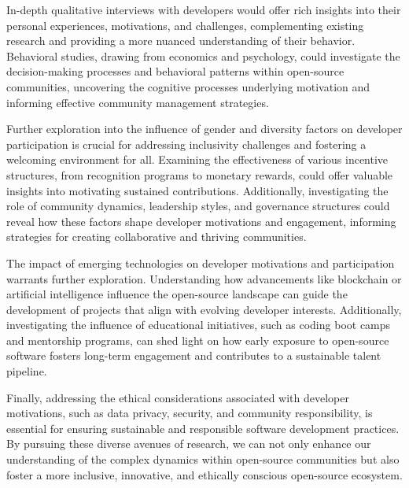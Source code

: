 In-depth qualitative interviews with developers would offer rich insights into their personal experiences, motivations, and challenges, complementing existing research and providing a more nuanced understanding of their behavior.  Behavioral studies, drawing from economics and psychology, could investigate the decision-making processes and behavioral patterns within open-source communities, uncovering the cognitive processes underlying motivation and informing effective community management strategies.

Further exploration into the influence of gender and diversity factors on developer participation is crucial for addressing inclusivity challenges and fostering a welcoming environment for all. Examining the effectiveness of various incentive structures, from recognition programs to monetary rewards, could offer valuable insights into motivating sustained contributions. Additionally, investigating the role of community dynamics, leadership styles, and governance structures could reveal how these factors shape developer motivations and engagement, informing strategies for creating collaborative and thriving communities.

The impact of emerging technologies on developer motivations and participation warrants further exploration. Understanding how advancements like blockchain or artificial intelligence influence the open-source landscape can guide the development of projects that align with evolving developer interests.  Additionally, investigating the influence of educational initiatives, such as coding boot camps and mentorship programs, can shed light on how early exposure to open-source software fosters long-term engagement and contributes to a sustainable talent pipeline.

Finally, addressing the ethical considerations associated with developer motivations, such as data privacy, security, and community responsibility, is essential for ensuring sustainable and responsible software development practices.  By pursuing these diverse avenues of research, we can not only enhance our understanding of the complex dynamics within open-source communities but also foster a more inclusive, innovative, and ethically conscious open-source ecosystem.